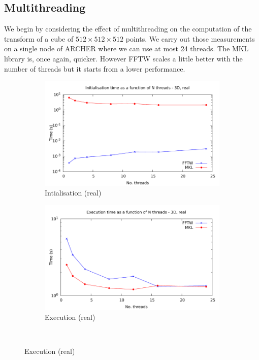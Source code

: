 \documentclass[12pt, a4paper]{article}
\begin{document}
\subsection{Multithreading}\label{MULTITHREADING}
We begin by considering the effect of multithreading on the computation of the transform of a cube of $512 \times 512 \times 512$ points. We carry out those measurements on a single node of ARCHER where we can use at most 24 threads. The MKL library is, once again, quicker. However FFTW scales a little better with the number of threads but it starts from  a lower performance.
\begin{figure}[H]
\captionsetup{width=0.8\linewidth}
\centering
\begin{subfigure}{.5\textwidth}
\centering
\includegraphics[width=.9\linewidth]{graphs/3d-multh-init-r.pdf}
\caption{Intialisation (real)}
\label{3DMULTHRI}
\end{subfigure}%
\begin{subfigure}{.5\textwidth}
\centering
\includegraphics[width=.9\linewidth]{graphs/3d-multh-exec-r.pdf}
\caption{Execution (real)}
\label{3DMULTHRE}
\end{subfigure}\\

\end{figure}
\end{document}
